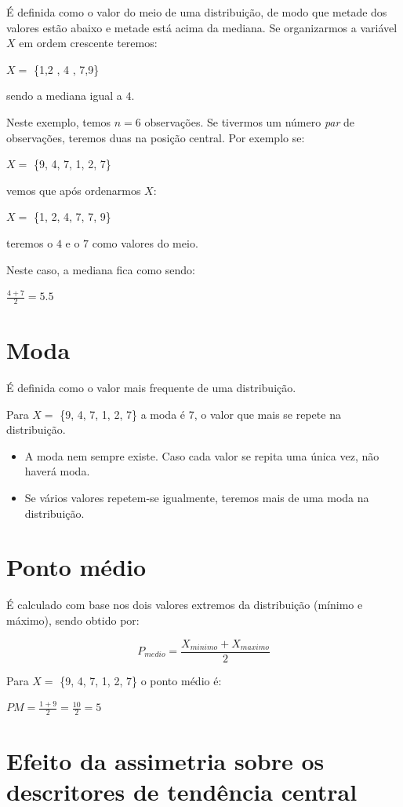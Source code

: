 \documentclass[
]{book}
\begin{document}
É definida como o valor do meio de uma distribuição, de modo que metade dos valores estão abaixo e metade está acima da mediana. Se organizarmos a variável \(X\) em ordem crescente teremos:

\(X =\) \{1,2 , 4 , 7,9\}

sendo a mediana igual a \(4\).

Neste exemplo, temos \(n = 6\) observações. Se tivermos um número \emph{par} de observações, teremos duas na posição central. Por exemplo se:

\(X =\) \{9, 4, 7, 1, 2, 7\}

vemos que após ordenarmos \(X\):

\(X =\) \{1, 2, 4, 7, 7, 9\}

teremos o \(4\) e o \(7\) como valores do meio.

Neste caso, a mediana fica como sendo:

\(\frac{4 + 7}{2} = 5.5\)

\hypertarget{moda}{%
\section{Moda}\label{moda}}

É definida como o valor mais frequente de uma distribuição.

Para \(X =\) \{9, 4, 7, 1, 2, 7\} a moda é 7, o valor que mais se repete na distribuição.

\begin{itemize}
\item
  A moda nem sempre existe. Caso cada valor se repita uma única vez, não haverá moda.
\item
  Se vários valores repetem-se igualmente, teremos mais de uma moda na distribuição.
\end{itemize}

\hypertarget{ponto-muxe9dio}{%
\section{Ponto médio}\label{ponto-muxe9dio}}

É calculado com base nos dois valores extremos da distribuição (mínimo e máximo), sendo obtido por:

\[P_{medio}=\frac{X_{minimo} + X_{maximo}}{2}\]

Para \(X =\) \{9, 4, 7, 1, 2, 7\} o ponto médio é:

\(PM = \frac{1 + 9}{2} = \frac{10}{2} = 5\)

\hypertarget{efeito-da-assimetria-sobre-os-descritores-de-tenduxeancia-central}{%
\section{Efeito da assimetria sobre os descritores de tendência central}\label{efeito-da-assimetria-sobre-os-descritores-de-tenduxeancia-central}}
\end{document}
